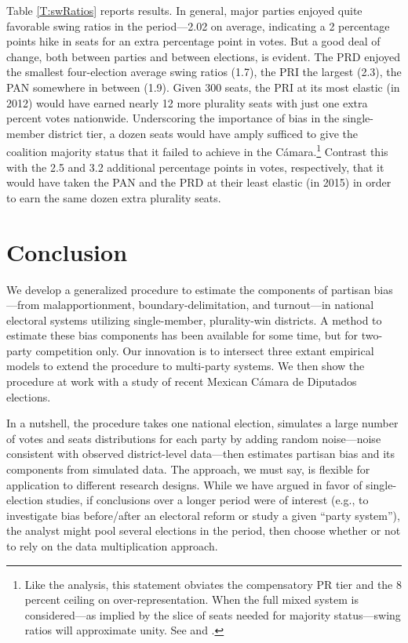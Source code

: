 \documentclass[letter,12pt]{article}
\begin{document}
{Table \ref{T:swRatios} reports results. In general, major parties enjoyed quite favorable swing ratios in the period---2.02 on average, indicating a 2 percentage points hike in seats for an extra percentage point in votes. But a good deal of change, both between parties and between elections, is evident. The PRD enjoyed the smallest four-election average swing ratios (1.7), the PRI the largest (2.3), the PAN somewhere in between (1.9). Given 300 seats, the PRI at its most elastic (in 2012) would have earned nearly 12 more plurality seats with just one extra percent votes nationwide. Underscoring the importance of bias in the single-member district tier, a dozen seats would have amply sufficed to give the coalition majority status that it failed to achieve in the C\'amara.\footnote{Like the analysis, this statement obviates the compensatory PR tier and the 8 percent ceiling on over-representation. When the full mixed system is considered---as implied by the slice of seats needed for majority status---swing ratios will approximate unity. See \citet{weldonMixedMemberSys2001} and \citet{marquez.aparicio.2010}.} Contrast this with the 2.5 and 3.2 additional percentage points in votes, respectively, that it would have taken the PAN and the PRD at their least elastic (in 2015) in order to earn the same dozen extra plurality seats. 



\section{Conclusion}

We develop a generalized procedure to estimate the components of partisan bias---from malapportionment, boundary-delimitation, and  turnout---in national electoral systems utilizing single-member, plurality-win districts. A method to estimate these bias components has been available for some time, but for two-party competition only. Our innovation is to intersect three extant empirical models to extend the procedure to multi-party systems. We then show the procedure at work with a study of recent Mexican C\'amara de Diputados elections. 

In a nutshell, the procedure takes one national election, simulates a large number of votes and seats distributions for each party by adding random noise---noise consistent with observed district-level data---then estimates partisan bias and its components from simulated data. The approach, we must say, is flexible for application to different research designs. While we have argued in favor of single-election studies, if conclusions over a longer period were of interest (e.g., to investigate bias before/after an electoral reform or study a given ``party system''), the analyst might pool several elections in the period, then choose whether or not to rely on the data multiplication approach. 

}
\end{document}
